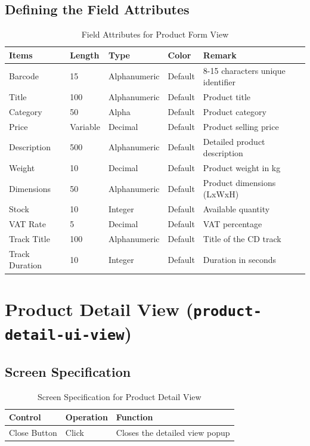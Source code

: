 \documentclass{article}
\begin{document}
\subsection{Defining the Field Attributes}
\begin{table}[h!]
\centering
\begin{tabularx}{\textwidth}{|l|l|l|l|X|}
\hline
\textbf{Items} & \textbf{Length} & \textbf{Type} & \textbf{Color} & \textbf{Remark} \\
\hline
Barcode & 15 & Alphanumeric & Default & 8-15 characters unique identifier \\
\hline
Title & 100 & Alphanumeric & Default & Product title \\
\hline
Category & 50 & Alpha & Default & Product category \\
\hline
Price & Variable & Decimal & Default & Product selling price \\
\hline
Description & 500 & Alphanumeric & Default & Detailed product description \\
\hline
Weight & 10 & Decimal & Default & Product weight in kg \\
\hline
Dimensions & 50 & Alphanumeric & Default & Product dimensions (LxWxH) \\
\hline
Stock & 10 & Integer & Default & Available quantity \\
\hline
VAT Rate & 5 & Decimal & Default & VAT percentage \\
\hline
Track Title & 100 & Alphanumeric & Default & Title of the CD track \\
\hline
Track Duration & 10 & Integer & Default & Duration in seconds \\
\hline
\end{tabularx}
\caption{Field Attributes for Product Form View}
\end{table}

\section{Product Detail View (\texttt{product-detail-ui-view})}
\subsection{Screen Specification}
\begin{table}[h!]
\centering
\begin{tabularx}{\textwidth}{|l|l|X|}
\hline
\textbf{Control} & \textbf{Operation} & \textbf{Function} \\
\hline
Close Button & Click & Closes the detailed view popup \\
\hline
\end{tabularx}
\caption{Screen Specification for Product Detail View}
\end{table}
\end{document}
